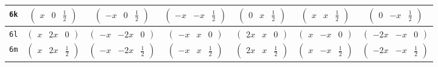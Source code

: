 \documentclass[fleqn,9pt,landscape]{jsarticle}
\begin{document}
\begin{center}
\begin{longtable}{ccccccc}
{\tt 6k} & $ \begin{pmatrix} x & 0 & \frac{1}{2} \end{pmatrix} $ & $ \begin{pmatrix} - x & 0 & \frac{1}{2} \end{pmatrix} $ & $ \begin{pmatrix} - x & - x & \frac{1}{2} \end{pmatrix} $ & $ \begin{pmatrix} 0 & x & \frac{1}{2} \end{pmatrix} $ & $ \begin{pmatrix} x & x & \frac{1}{2} \end{pmatrix} $ & $ \begin{pmatrix} 0 & - x & \frac{1}{2} \end{pmatrix} $ \\ \hline
{\tt 6l} & $ \begin{pmatrix} x & 2 x & 0 \end{pmatrix} $ & $ \begin{pmatrix} - x & - 2 x & 0 \end{pmatrix} $ & $ \begin{pmatrix} - x & x & 0 \end{pmatrix} $ & $ \begin{pmatrix} 2 x & x & 0 \end{pmatrix} $ & $ \begin{pmatrix} x & - x & 0 \end{pmatrix} $ & $ \begin{pmatrix} - 2 x & - x & 0 \end{pmatrix} $ \\ \hline
{\tt 6m} & $ \begin{pmatrix} x & 2 x & \frac{1}{2} \end{pmatrix} $ & $ \begin{pmatrix} - x & - 2 x & \frac{1}{2} \end{pmatrix} $ & $ \begin{pmatrix} - x & x & \frac{1}{2} \end{pmatrix} $ & $ \begin{pmatrix} 2 x & x & \frac{1}{2} \end{pmatrix} $ & $ \begin{pmatrix} x & - x & \frac{1}{2} \end{pmatrix} $ & $ \begin{pmatrix} - 2 x & - x & \frac{1}{2} \end{pmatrix} $ \\ \hline

\end{longtable}
\end{center}
\end{document}
